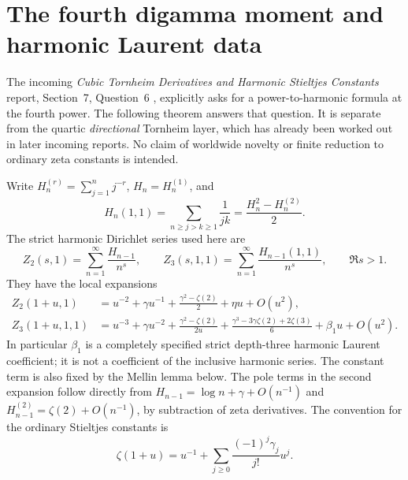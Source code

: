 \documentclass[11pt]{article}
\numberwithin{equation}{section}
\theoremstyle{plain}
\theoremstyle{definition}
\theoremstyle{remark}
\begin{document}


\section{The fourth digamma moment and harmonic Laurent data}
\label{bhr:quartic-harmonic:sec}

The incoming \emph{Cubic Tornheim Derivatives and Harmonic Stieltjes Constants}
report, Section~7,
Question~6 \cite{bhr:Cubic}, explicitly asks for a power-to-harmonic formula at the fourth
power. The following theorem answers that question. It is separate from
the quartic \emph{directional} Tornheim layer, which has already been
worked out in later incoming reports. No claim of worldwide novelty or
finite reduction to ordinary zeta constants is intended.

Write $H_n^{(r)}=\sum_{j=1}^n j^{-r}$, $H_n=H_n^{(1)}$, and
\[
 H_n(1,1)=\sum_{n\ge j>k\ge1}\frac1{jk}
         =\frac{H_n^2-H_n^{(2)}}2.
\]
The strict harmonic Dirichlet series used here are
\[
 Z_2(s,1)=\sum_{n=1}^{\infty}\frac{H_{n-1}}{n^s},\qquad
 Z_3(s,1,1)=\sum_{n=1}^{\infty}\frac{H_{n-1}(1,1)}{n^s},
 \qquad \Re s>1.
\]
They have the local expansions
\begin{align}
 Z_2(1+u,1)&=u^{-2}+\gamma u^{-1}
       +\frac{\gamma^2-\zeta(2)}2+\eta u+O(u^2),
       \label{bhr:quartic-harmonic:eta}\\
 Z_3(1+u,1,1)&=u^{-3}+\gamma u^{-2}
       +\frac{\gamma^2-\zeta(2)}{2u}
       +\frac{\gamma^3-3\gamma\zeta(2)+2\zeta(3)}6
       +\beta_1u+O(u^2).
       \label{bhr:quartic-harmonic:beta}
\end{align}
In particular $\beta_1$ is a completely specified strict depth-three
harmonic Laurent coefficient; it is not a coefficient of the inclusive
harmonic series. The constant term is also fixed by the Mellin lemma below.
The pole terms in the second expansion follow directly
from $H_{n-1}=\log n+\gamma+O(n^{-1})$ and
$H_{n-1}^{(2)}=\zeta(2)+O(n^{-1})$, by subtraction of zeta derivatives.
The convention for the ordinary Stieltjes constants is
\[
 \zeta(1+u)=u^{-1}+\sum_{j\ge0}\frac{(-1)^j\gamma_j}{j!}u^j.
\]
\end{document}
